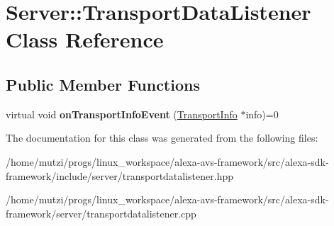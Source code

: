 \hypertarget{classServer_1_1TransportDataListener}{}\section{Server\+:\+:Transport\+Data\+Listener Class Reference}
\label{classServer_1_1TransportDataListener}
\subsection*{Public Member Functions}
\begin{DoxyCompactItemize}
\item 
\mbox{\label{classServer_1_1TransportDataListener_af42a3852b9eecae22ff0008b58e4bbb5}} 
virtual void {\bfseries on\+Transport\+Info\+Event} (\hyperlink{classAlexaEvent_1_1TransportInfo}{Transport\+Info} $\ast$info)=0
\end{DoxyCompactItemize}


The documentation for this class was generated from the following files\+:\begin{DoxyCompactItemize}
\item 
/home/mutzi/progs/linux\+\_\+workspace/alexa-\/avs-\/framework/src/alexa-\/sdk-\/framework/include/server/transportdatalistener.\+hpp\item 
/home/mutzi/progs/linux\+\_\+workspace/alexa-\/avs-\/framework/src/alexa-\/sdk-\/framework/server/transportdatalistener.\+cpp\end{DoxyCompactItemize}
